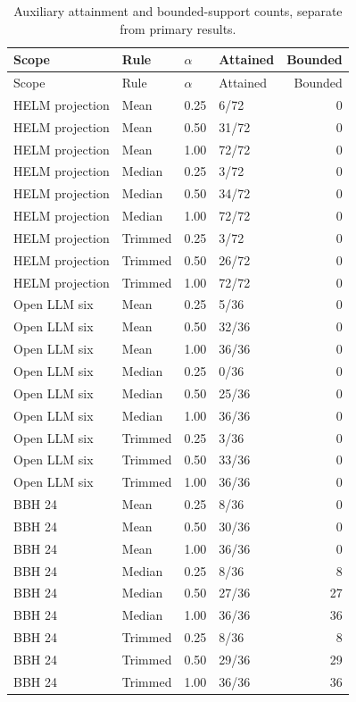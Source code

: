\documentclass{article}
\begin{document}
\begin{longtable}{llllr}
\caption{Auxiliary attainment and bounded-support counts, separate from primary results.}\\
\toprule Scope & Rule & $\alpha$ & Attained & Bounded\\\midrule
\endfirsthead
\toprule Scope & Rule & $\alpha$ & Attained & Bounded\\\midrule
\endhead
HELM projection & Mean & 0.25 & 6/72 & 0 \\
HELM projection & Mean & 0.50 & 31/72 & 0 \\
HELM projection & Mean & 1.00 & 72/72 & 0 \\
HELM projection & Median & 0.25 & 3/72 & 0 \\
HELM projection & Median & 0.50 & 34/72 & 0 \\
HELM projection & Median & 1.00 & 72/72 & 0 \\
HELM projection & Trimmed & 0.25 & 3/72 & 0 \\
HELM projection & Trimmed & 0.50 & 26/72 & 0 \\
HELM projection & Trimmed & 1.00 & 72/72 & 0 \\
Open LLM six & Mean & 0.25 & 5/36 & 0 \\
Open LLM six & Mean & 0.50 & 32/36 & 0 \\
Open LLM six & Mean & 1.00 & 36/36 & 0 \\
Open LLM six & Median & 0.25 & 0/36 & 0 \\
Open LLM six & Median & 0.50 & 25/36 & 0 \\
Open LLM six & Median & 1.00 & 36/36 & 0 \\
Open LLM six & Trimmed & 0.25 & 3/36 & 0 \\
Open LLM six & Trimmed & 0.50 & 33/36 & 0 \\
Open LLM six & Trimmed & 1.00 & 36/36 & 0 \\
BBH 24 & Mean & 0.25 & 8/36 & 0 \\
BBH 24 & Mean & 0.50 & 30/36 & 0 \\
BBH 24 & Mean & 1.00 & 36/36 & 0 \\
BBH 24 & Median & 0.25 & 8/36 & 8 \\
BBH 24 & Median & 0.50 & 27/36 & 27 \\
BBH 24 & Median & 1.00 & 36/36 & 36 \\
BBH 24 & Trimmed & 0.25 & 8/36 & 8 \\
BBH 24 & Trimmed & 0.50 & 29/36 & 29 \\
BBH 24 & Trimmed & 1.00 & 36/36 & 36 \\
\bottomrule
\end{longtable}
\end{document}
